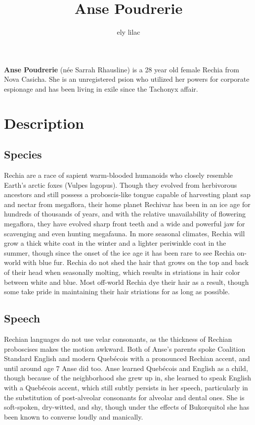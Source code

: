\documentclass[12pt,a4paper,twocolumn]{article}
\begin{document}
	\title{Anse Poudrerie}
	\author{ely lilac\vspace{-2ex}}
	\date{\vspace{-5ex}}
	\maketitle
	
	\begin{strip}
		\textbf{Anse Poudrerie} (née Sarrah Rhausline) is a 28 year old female Rechia from Nova Casicha. She is an unregistered psion who utilized her powers for corporate espionage and has been living in exile since the Tachonyx affair.
		
		
		
		
		\section{Description}
	\end{strip}
	
	
	\subsection{Species}
	Rechia are a race of sapient warm-blooded humanoids who closely resemble Earth's arctic foxes (Vulpes lagopus). Though they evolved from herbivorous ancestors and still possess a proboscis-like tongue capable of harvesting plant sap and nectar from megaflora, their home planet Rechivar has been in an ice age for hundreds of thousands of years, and with the relative unavailability of flowering megaflora, they have evolved sharp front teeth and a wide and powerful jaw for scavenging and even hunting megafauna.
	In more seasonal climates, Rechia will grow a thick white coat in the winter and a lighter periwinkle coat in the summer, though since the onset of the ice age it has been rare to see Rechia on-world with blue fur. Rechia do not shed the hair that grows on the top and back of their head when seasonally molting, which results in striations in hair color between white and blue. Most off-world Rechia dye their hair as a result, though some take pride in maintaining their hair striations for as long as possible.
	
	\subsection{Speech}
	Rechian languages do not use velar consonants, as the thickness of Rechian proboscises makes the motion awkward. Both of Anse's parents spoke Coalition Standard English and modern Quebécois with a pronounced Rechian accent, and until around age 7 Anse did too. Anse learned Quebécois and English as a child, though because of the neighborhood she grew up in, she learned to speak English with a Quebécois accent, which still subtly persists in her speech, particularly in the substitution of post-alveolar consonants for alveolar and dental ones. She is soft-spoken, dry-witted, and shy, though under the effects of Bukorquitol she has been known to converse loudly and manically.
	
\end{document}
